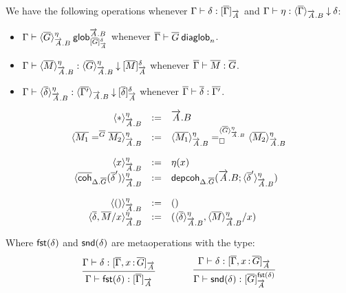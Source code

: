 We have the following operations whenever
$\ofinterp{\Gamma}{\delta}{\diag\Gamma}{\tel A}$ and
$\ofinterpdep{\Gamma}{\eta}{\diag\Gamma}{\tel A.B}{\delta}$:

\begin{itemize}
\item
$\wfdepglob{\Gamma}{\interpdepglob{\diag G}{\tel A.B}{\eta}}{\tel A.B}
  {\interpglob{\diag G}{\tel A}{\delta}}$
whenever
$\wfdiaglob{\diag\Gamma}{\diag G}n$.

\item
$\ofdepglob{\Gamma}{\interpdepglob{\diag M}{\tel A.B}{\eta}}
 {\interpdepglob{\diag G}{\tel A.B}{\eta}}
 {\interpglob{\diag M}{\tel A}{\delta}}$
whenever
$\ofdiaglob{\diag\Gamma}{\diag M}{\diag G}$.

\item
$\ofinterpdep{\Gamma}
  {\interpdepglob{\diag\delta}{\tel A.B}{\eta}}{\diag{\Gamma'}}{\tel A.B}
  {\interpglob{\diag\delta}{\tel A}{\delta}}$
whenever
$\ofdiaglob{\diag\Gamma}{\diag\delta}{\diag{\Gamma'}}$.
\end{itemize}

\[
  \begin{array}{rcl}
    \interpdepglob{\diagbase}{\tel A.B}{\eta} & := & \tel A.B \\
    \interpdepglob{\homj{\diag G}{\diag{M_1}}{\diag{M_2}}}
      {\tel A.B}{\eta} & := &
    \dhomj
      {\interpdepglob{\diag G}{\tel A.B}{\eta}}
      {\interpdepglob{\diag{M_1}}{\tel A.B}{\eta}}
      {\interpdepglob{\diag{M_2}}{\tel A.B}{\eta}}
      {\blank}
    \\\\

    \interpdepglob{x}{\tel A.B}{\eta} & := & \eta(x) \\
    \interpdepglob
      {\diagcoh{\Delta.\diag{G}}{\diag \delta'}}{\tel A.B}{\eta} & := &
    \depcoh{\Delta.\diag G}{\tel A.B}
      {\interpdepglob{\diag\delta'}{\tel A.B}{\eta}} \\\\

    \interpdepglob{()}{\tel A.B}{\eta} & := & () \\
    \interpdepglob{\diag\delta,\diag M/x}{\tel A.B}{\eta} & := &
    (\interpdepglob{\diag\delta}{\tel A.B}{\eta},\interpdepglob{\diag
    M}{\tel A.B}{\eta}/x)
  \end{array}
\]

Where $\fstinterp{\delta}$ and $\sndinterp{\delta}$ are metaoperations with the
type:
\[
\infer
  {\ofinterp{\Gamma}{\fstinterp\delta}{\diag\Gamma}{\tel A}}
  {\ofinterp{\Gamma}{\delta}{\diag\Gamma,\tptm{x}{\diag G}}{\tel A}}
\qquad\qquad
\infer
  {\ofglob{\Gamma}{\sndinterp\delta}
   {\interpglob{\diag G}{\tel A}{\fstinterp\delta}}}
  {\ofinterp{\Gamma}{\delta}{\diag\Gamma,\tptm{x}{\diag G}}{\tel A}}
\]

